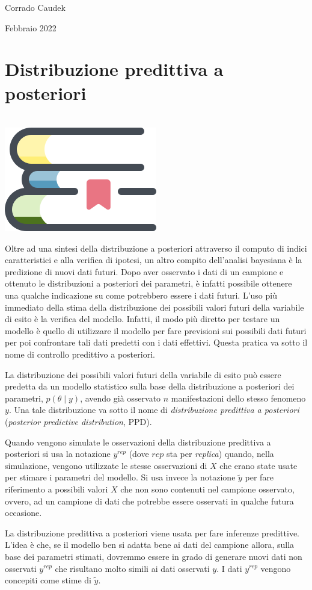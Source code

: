 \documentclass[
  10pt,
  italian,
  a4paper,
  extrafontsizes,onecolumn,openright
  ]{memoir}
\newenvironment{mdframedwithfootChapterintro}
{   
    \savenotes
    \begin{mdframed}[%
    topline=true, bottomline=true, linecolor=oiB, linewidth=1.4pt,
    rightline=false, leftline=false,
    backgroundcolor=oiLB]
    \renewcommand{\thempfootnote}{\arabic{footnote}}
    }
{
    \end{mdframed}
    \spewnotes
}
\newenvironment{chapterintro}{
\vspace{4mm}
\begin{mdframedwithfootChapterintro}
\begin{minipage}[t]{0.10\textwidth}
{$\:$ \\ \setkeys{Gin}{width=2.5em,keepaspectratio}\includegraphics{images/_icons/chapterintro.png}}
\end{minipage}
\hfill
\begin{minipage}[t]{0.90\textwidth}
\setlength{\parskip}{1em}
\large
}{\end{minipage}
\end{mdframedwithfootChapterintro}
\vspace{4mm}
}
\begin{document}
\bigskip

Corrado Caudek

\bigskip

Febbraio 2022

\mainmatter

\hypertarget{chapter-ppc}{%
\chapter{Distribuzione predittiva a posteriori}\label{chapter-ppc}}

\begin{chapterintro}
Oltre ad una sintesi della distribuzione a posteriori attraverso il computo di indici caratteristici e alla verifica di ipotesi, un altro compito dell'analisi bayesiana è la predizione di nuovi dati futuri. Dopo aver osservato i dati di un campione e ottenuto le distribuzioni a posteriori dei parametri, è infatti possibile ottenere una qualche indicazione su come potrebbero essere i dati futuri. L'uso più immediato della stima della distribuzione dei possibili valori futuri della variabile di esito è la verifica del modello. Infatti, il modo più diretto per testare un modello è quello di utilizzare il modello per fare previsioni sui possibili dati futuri per poi confrontare tali dati predetti con i dati effettivi. Questa pratica va sotto il nome di controllo predittivo a posteriori.

\end{chapterintro}

La distribuzione dei possibili valori futuri della variabile di esito può essere predetta da un modello statistico sulla base della distribuzione a posteriori dei parametri, \(p(\theta \mid y)\), avendo già osservato \(n\) manifestazioni dello stesso fenomeno \(y\). Una tale distribuzione va sotto il nome di \emph{distribuzione predittiva a posteriori} (\emph{posterior predictive distribution}, PPD).

Quando vengono simulate le osservazioni della distribuzione predittiva a posteriori si usa la notazione \(y^{rep}\) (dove \(rep\) sta per \emph{replica}) quando, nella simulazione, vengono utilizzate le stesse osservazioni di \(X\) che erano state usate per stimare i parametri del modello. Si usa invece la notazione \(\tilde{y}\) per fare riferimento a possibili valori \(X\) che non sono contenuti nel campione osservato, ovvero, ad un campione di dati che potrebbe essere osservati in qualche futura occasione.

La distribuzione predittiva a posteriori viene usata per fare inferenze predittive. L'idea è che, se il modello ben si adatta bene ai dati del campione allora, sulla base dei parametri stimati, dovremmo essere in grado di generare nuovi dati non osservati \(y^{rep}\) che risultano molto simili ai dati osservati \(y\). I dati \(y^{rep}\) vengono concepiti come stime di \(\tilde{y}\).
\end{document}
